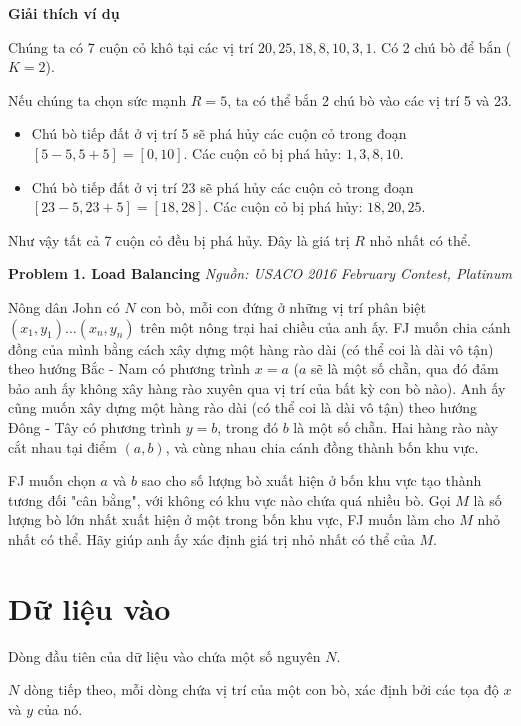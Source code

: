 \documentclass[12pt,a4paper]{article}
\newcommand{\problem}[2]{%
  \addcontentsline{toc}{section}{#1}%
  \begin{mdframed}[
    linecolor=framecolor,
    linewidth=1.5pt,
    backgroundcolor=white,
    topline=true, bottomline=true,
    leftline=true, rightline=true,
    innerleftmargin=10pt, innerrightmargin=10pt,
    innertopmargin=6pt, innerbottommargin=6pt,
  ]
  \textbf{\large #1} \hfill \textit{Nguồn: #2}
  \end{mdframed}
  \vspace{4pt}%
}
\newcommand{\explanation}{%
  \vspace{6pt}\textbf{\textcolor{sectioncolor}{Giải thích ví dụ}}\par\vspace{2pt}%
}
\begin{document}
\explanation
Chúng ta có 7 cuộn cỏ khô tại các vị trí $20, 25, 18, 8, 10, 3, 1$. Có 2 chú bò để bắn ($K=2$).

Nếu chúng ta chọn sức mạnh $R = 5$, ta có thể bắn 2 chú bò vào các vị trí 5 và 23.
\begin{itemize}
    \item Chú bò tiếp đất ở vị trí 5 sẽ phá hủy các cuộn cỏ trong đoạn $[5-5, 5+5] = [0, 10]$. Các cuộn cỏ bị phá hủy: $1, 3, 8, 10$.
    \item Chú bò tiếp đất ở vị trí 23 sẽ phá hủy các cuộn cỏ trong đoạn $[23-5, 23+5] = [18, 28]$. Các cuộn cỏ bị phá hủy: $18, 20, 25$.
\end{itemize}
Như vậy tất cả 7 cuộn cỏ đều bị phá hủy. Đây là giá trị $R$ nhỏ nhất có thể.


\newpage







\problem{Problem 1. Load Balancing}{USACO 2016 February Contest, Platinum}

Nông dân John có $N$ con bò, mỗi con đứng ở những vị trí phân biệt $(x_1, y_1) \ldots (x_n, y_n)$ trên một nông trại hai chiều của anh ấy. FJ muốn chia cánh đồng của mình bằng cách xây dựng một hàng rào dài (có thể coi là dài vô tận) theo hướng Bắc - Nam có phương trình $x=a$ ($a$ sẽ là một số chẵn, qua đó đảm bảo anh ấy không xây hàng rào xuyên qua vị trí của bất kỳ con bò nào). Anh ấy cũng muốn xây dựng một hàng rào dài (có thể coi là dài vô tận) theo hướng Đông - Tây có phương trình $y=b$, trong đó $b$ là một số chẵn. Hai hàng rào này cắt nhau tại điểm $(a,b)$, và cùng nhau chia cánh đồng thành bốn khu vực.

FJ muốn chọn $a$ và $b$ sao cho số lượng bò xuất hiện ở bốn khu vực tạo thành tương đối "cân bằng", với không có khu vực nào chứa quá nhiều bò. Gọi $M$ là số lượng bò lớn nhất xuất hiện ở một trong bốn khu vực, FJ muốn làm cho $M$ nhỏ nhất có thể. Hãy giúp anh ấy xác định giá trị nhỏ nhất có thể của $M$.

\section*{Dữ liệu vào}
\begin{inputbox}
Dòng đầu tiên của dữ liệu vào chứa một số nguyên $N$. 

$N$ dòng tiếp theo, mỗi dòng chứa vị trí của một con bò, xác định bởi các tọa độ $x$ và $y$ của nó.
\end{inputbox}
\end{document}
